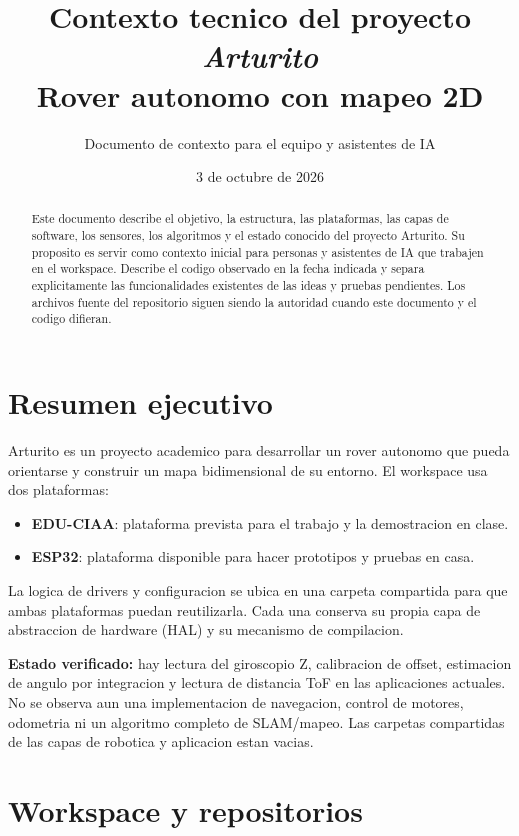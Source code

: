 \documentclass[11pt,a4paper]{article}
\title{Contexto tecnico del proyecto \textit{Arturito}\\
       Rover autonomo con mapeo 2D}
\author{Documento de contexto para el equipo y asistentes de IA}
\date{3 de octubre de 2026}
\newcommand{\estado}[1]{\textbf{Estado verificado:} #1}
\begin{document}
\maketitle

\begin{abstract}
Este documento describe el objetivo, la estructura, las plataformas, las capas de software, los sensores, los algoritmos y el estado conocido del proyecto Arturito. Su proposito es servir como contexto inicial para personas y asistentes de IA que trabajen en el workspace. Describe el codigo observado en la fecha indicada y separa explicitamente las funcionalidades existentes de las ideas y pruebas pendientes. Los archivos fuente del repositorio siguen siendo la autoridad cuando este documento y el codigo difieran.
\end{abstract}

\tableofcontents
\newpage

\section{Resumen ejecutivo}

Arturito es un proyecto academico para desarrollar un rover autonomo que pueda orientarse y construir un mapa bidimensional de su entorno. El workspace usa dos plataformas:

\begin{itemize}
  \item \textbf{EDU-CIAA}: plataforma prevista para el trabajo y la demostracion en clase.
  \item \textbf{ESP32}: plataforma disponible para hacer prototipos y pruebas en casa.
\end{itemize}


La logica de drivers y configuracion se ubica en una carpeta compartida para que ambas plataformas puedan reutilizarla. Cada una conserva su propia capa de abstraccion de hardware (HAL) y su mecanismo de compilacion.

\estado{hay lectura del giroscopio Z, calibracion de offset, estimacion de angulo por integracion y lectura de distancia ToF en las aplicaciones actuales. No se observa aun una implementacion de navegacion, control de motores, odometria ni un algoritmo completo de SLAM/mapeo. Las carpetas compartidas de las capas de robotica y aplicacion estan vacias.}

\section{Workspace y repositorios}
\end{document}
